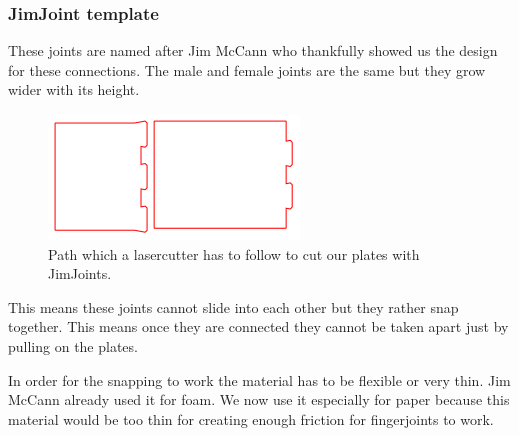 \documentclass[../ClassicThesis.tex]{subfiles}
\begin{document}
\subsubsection{JimJoint template}
\begin{minipage}{0.6\textwidth}

These joints are named after Jim McCann who thankfully showed us the design for these connections.
The male and female joints are the same but they grow wider with its height.
\end{minipage}
\begin{minipage}{0.4\textwidth}
\begin{figure}[!ht]
\centering
\includegraphics[width=1\columnwidth]{Images/jimjoints.png}
\caption{Path which a lasercutter has to follow to cut our plates with JimJoints.}
\end{figure}

\end{minipage}
This means these joints cannot slide into each other but they rather snap together. This means once they are connected they cannot be taken apart just by pulling on the plates. 

In order for the snapping to work the material has to be flexible or very thin. Jim McCann already used it for foam. We now use it especially for paper because this material would be too thin for creating enough friction for fingerjoints to work.
\end{document}
